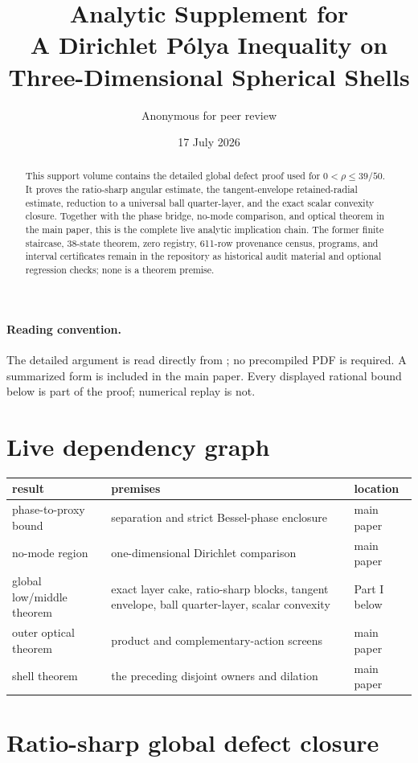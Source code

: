 \documentclass[11pt]{article}
\title{Analytic Supplement for\\
A Dirichlet P\'olya Inequality on\\
Three-Dimensional Spherical Shells}
\author{Anonymous for peer review}
\date{17 July 2026}
\theoremstyle{remark}
\begin{document}
\maketitle

\begin{abstract}
This support volume contains the detailed global defect proof used for
$0<\rho\leq39/50$.  It proves the ratio-sharp angular estimate, the
tangent-envelope retained-radial estimate, reduction to a universal ball
quarter-layer, and the exact scalar convexity closure.  Together with the
phase bridge, no-mode comparison, and optical theorem in the main paper,
this is the complete live analytic implication chain.  The former finite
staircase, 38-state theorem, zero registry, 611-row provenance census,
programs, and interval certificates remain in the repository as historical
audit material and optional regression checks; none is a theorem premise.
\end{abstract}

\paragraph{Reading convention.}
The detailed argument is read directly from
; no precompiled PDF is
required.  A summarized form is included in the main paper.  Every displayed
rational bound below is part of the proof; numerical replay is not.

\section*{Live dependency graph}

\begin{center}
\small
\renewcommand{\arraystretch}{1.15}
\begin{tabular}{@{}p{3.3cm}p{5.1cm}p{3.2cm}@{}}
\toprule
result&premises&location\\
\midrule
phase-to-proxy bound&
separation and strict Bessel-phase enclosure&
main paper\\
no-mode region&
one-dimensional Dirichlet comparison&
main paper\\
global low/middle theorem&
exact layer cake, ratio-sharp blocks, tangent envelope,
ball quarter-layer, scalar convexity&
Part I below\\
outer optical theorem&
product and complementary-action screens&
main paper\\
shell theorem&
the preceding disjoint owners and dilation&
main paper\\
\bottomrule
\end{tabular}
\end{center}

\renewcommand{\thesection}{\Roman{section}}
\tableofcontents
\clearpage

\section{Ratio-sharp global defect closure}
\label{part:ratio}


\end{document}
